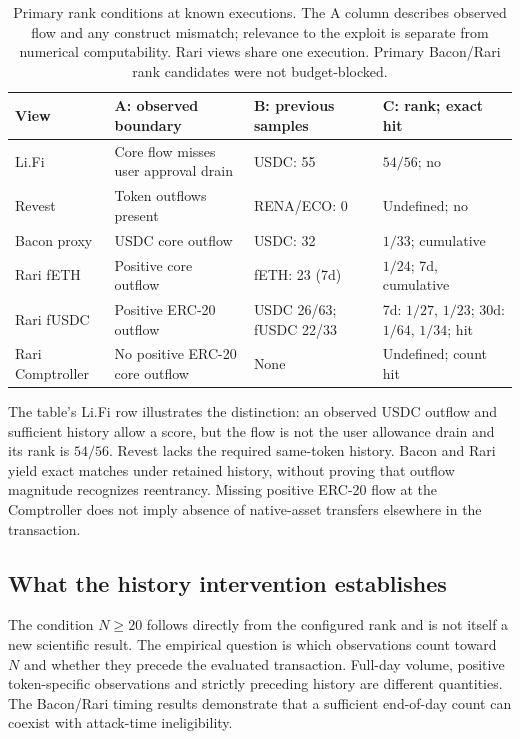 \documentclass[preprint,12pt,authoryear]{elsarticle}
\begin{document}
\begin{table}[htbp]
\centering\footnotesize
\caption{Primary rank conditions at known executions. The A column describes observed flow and any construct mismatch; relevance to the exploit is separate from numerical computability. Rari views share one execution. Primary Bacon/Rari rank candidates were not budget-blocked.}
\label{tab:abc}
\setlength{\tabcolsep}{3pt}
\begin{tabularx}{\linewidth}{p{2.0cm} >{\raggedright\arraybackslash}X >{\raggedright\arraybackslash}p{2.0cm} >{\raggedright\arraybackslash}X}
\toprule
View & A: observed boundary & B: previous samples & C: rank; exact hit \\
\midrule
Li.Fi & Core flow misses user approval drain & USDC: 55 & $54/56$; no \\
Revest & Token outflows present & RENA/ECO: 0 & Undefined; no \\
Bacon proxy & USDC core outflow & USDC: 32 & $1/33$; cumulative \\
Rari fETH & Positive core outflow & fETH: 23 (7d) & $1/24$; 7d, cumulative \\
Rari fUSDC & Positive ERC-20 outflow & USDC 26/63; fUSDC 22/33 & 7d: $1/27$, $1/23$; 30d: $1/64$, $1/34$; hit \\
Rari Comptroller & No positive ERC-20 core outflow & None & Undefined; count hit \\
\bottomrule
\end{tabularx}
\end{table}

The table's Li.Fi row illustrates the distinction: an observed USDC outflow and sufficient history allow a score, but the flow is not the user allowance drain and its rank is $54/56$. Revest lacks the required same-token history. Bacon and Rari yield exact matches under retained history, without proving that outflow magnitude recognizes reentrancy. Missing positive ERC-20 flow at the Comptroller does not imply absence of native-asset transfers elsewhere in the transaction.

\subsection{What the history intervention establishes}
The condition $N\geq20$ follows directly from the configured rank and is not itself a new scientific result. The empirical question is which observations count toward $N$ and whether they precede the evaluated transaction. Full-day volume, positive token-specific observations and strictly preceding history are different quantities. The Bacon/Rari timing results demonstrate that a sufficient end-of-day count can coexist with attack-time ineligibility.
\end{document}
